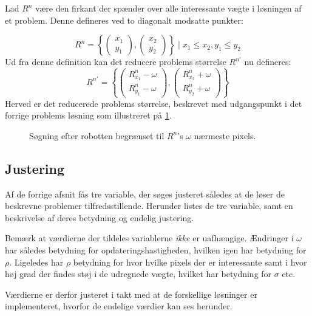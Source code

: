 Lad $R^n$ være den firkant der spænder over alle interessante vægte i løsningen af et problem.
Denne defineres ved to diagonalt modsatte punkter:
{
\newcommand{\cvec}[2]{\begin{pmatrix}#1\\#2\end{pmatrix}}

$$R^n = \left\{\cvec{x_1}{y_1}, \cvec{x_2}{y_2}\right\} \mid x_1 \leq x_2 , y_1 \leq y_2$$
Ud fra denne definition kan det reducere problems størrelse $R^{n'}$ nu defineres:
\begin{equation}\label{tracking:eq:inflate}
R^{n'} = \left\{
	\cvec{R^n_{x_1}-\omega}{R^n_{y_1}-\omega},
	\cvec{R^n_{x_2}+\omega}{R^n_{y_2}+\omega}
\right\}
\end{equation}
Herved er det reducerede problems størrelse, beskrevet med udgangspunkt i det forrige problems løsning som illustreret på \cref{tracking:reduction}.
}

\begin{figure}
\centering

\caption{Søgning efter robotten begrænset til $R^n$'s $\omega$ nærmeste pixels.}
\label{tracking:reduction}
\end{figure}

\subsection{Justering}\label{tracking:adjust}
Af de forrige afsnit fås tre variable, der søges justeret således at de løser de beskrevne problemer tilfredsstillende.
Herunder listes de tre variable, samt en beskrivelse af deres betydning og endelig justering.

Bemærk at værdierne der tildeles variablerne \emph{ikke} er uafhængige.
Ændringer i $\omega$ har således betydning for opdateringshastigheden, hvilken igen har betydning for $\rho$.
Ligeledes har $\rho$ betydning for hvor hvilke pixels der er interessante samt i hvor høj grad der findes støj i de udregnede vægte, hvilket har betydning for $\sigma$ etc.

Værdierne er derfor justeret i takt med at de forskellige løsninger er implementeret, hvorfor de endelige værdier kan ses herunder.

